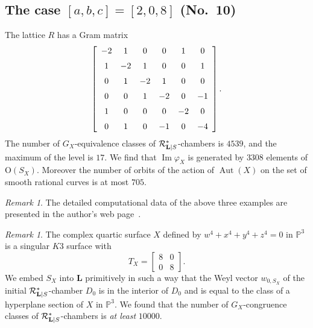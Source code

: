 \documentclass{amsart}
\theoremstyle{plain}
\theoremstyle{definition}
\theoremstyle{remark}
\newtheorem{remark}[theorem]{Remark}
\numberwithin{equation}{section}
\numberwithin{table}{section}
\numberwithin{figure}{section}
\newcommand{\C}{\mathord{\mathbb C}}
\renewcommand{\P}{\mathord{\mathbb  P}}
\newcommand{\RRR}{\mathord{\mathcal R}}
\newcommand{\set}[2]{\{\; {#1} \; \mid \; {#2} \;  \}}
\newcommand{\PGL}{\mathord{\mathrm {PGL}}}
\newcommand{\OG}{\mathord{\mathrm {O}}}
\newcommand{\Image}{\operatorname{\mathrm {Im}}\nolimits}
\newcommand{\Aut}{\operatorname{\mathrm {Aut}}\nolimits}
\renewcommand{\L}{\mathord{\mathbf{L}}}
\newcommand{\aut}{\operatorname{\mathit {Aut}}\nolimits}
\newcommand{\Roots}{\RRR}
\newcommand{\sphyp}{\sp*}
\newcommand{\RtsLS}{\Roots_{\L|S}}
\begin{document}
\subsection{The case $[a,b,c]=[2,0,8]$  (No.~10)}\label{subsec:208}
%
The lattice $R$ has a Gram matrix
$$
\left[ \begin {array}{cccccc} -2&1&0&0&1&0\\\noalign{\medskip}1&-2&1&0
&0&1\\\noalign{\medskip}0&1&-2&1&0&0\\\noalign{\medskip}0&0&1&-2&0&-1
\\\noalign{\medskip}1&0&0&0&-2&0\\\noalign{\medskip}0&1&0&-1&0&-4
\end {array} \right].
$$
The number of $G_X$-equivalence classes of $\RtsLS\sphyp$-chambers is $4539$,
and the maximum of the level is $17$.
We find that 
$\Image \varphi_X$ is generated by $3308$ elements of $\OG(S_X)$.
Moreover the number of orbits of the action of $\Aut(X)$ on the set of smooth rational curves is at most $705$.
%
%
\begin{remark}\label{rem:compdata}
The detailed computational data of the above  three examples are 
presented in the author's web page~\cite{compdataweb}.
\end{remark}
%
\begin{remark}\label{rem:complexFQ}
%
The complex  quartic surface $X$
defined by
$w^4+x^4+y^4+z^4=0$
in $\P^3$ is a singular $K3$ surface
with 
$$
T_X=\left[
\begin{array}{cc}
8 & 0 \\ 0 & 8
\end{array}
\right].
$$
We  embed $S_X$ into $\L$ 
primitively 
in such a way that 
the Weyl vector
$w_{0, {S_X}}$ 
 of the initial $\RtsLS\sphyp$-chamber $D_0$ is in the interior of $D_0$ 
and is equal to the class of a hyperplane section of $X$ in $\P^3$.
We  found that 
the number of $G_X$-congruence classes of $\RtsLS\sphyp$-chambers is \emph{at least} $10000$.
\end{remark}
%
\end{document}
